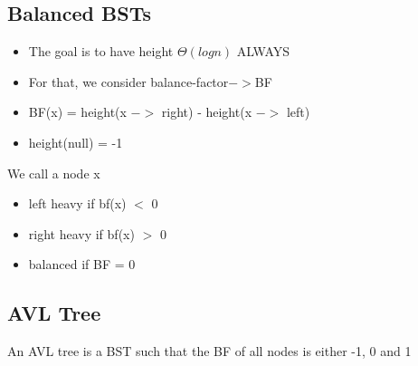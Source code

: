 \documentclass[12pt]{article}
\begin{document}
	\subsection*{Balanced BSTs}
	\begin{itemize}
		\item The goal is to have height $\Theta(logn)$ ALWAYS
		\item For that, we consider balance-factor$->$BF
		\item BF(x) = height(x $->$ right) - height(x $->$ left)
		\item height(null) = -1
	\end{itemize}
	
	We call a node x
	\begin{itemize}
		\item left heavy if bf(x) $<$ 0
		\item right heavy if bf(x) $>$ 0
		\item balanced if BF = 0
	\end{itemize}
	
	\subsection*{AVL Tree}
	An AVL tree is a BST such that the BF of all nodes is either -1, 0 and 1
	
\end{document}
